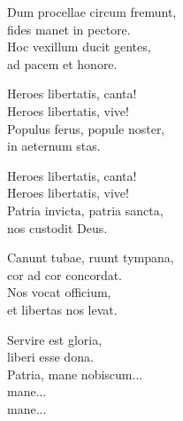 \begin{lyrics}
Dum procellae circum fremunt,\\
fides manet in pectore.\\
Hoc vexillum ducit gentes,\\
ad pacem et honore.

Heroes libertatis, canta!\\
Heroes libertatis, vive!\\
Populus ferus, popule noster,\\
in aeternum stas.

Heroes libertatis, canta!\\
Heroes libertatis, vive!\\
Patria invicta, patria sancta,\\
nos custodit Deus.

Canunt tubae, ruunt tympana,\\
cor ad cor concordat.\\
Nos vocat officium,\\
et libertas nos levat.

Servire est gloria,\\
liberi esse dona.\\
Patria, mane nobiscum...\\
mane...\\
mane...
\end{lyrics}

